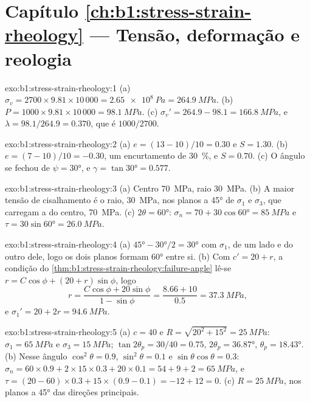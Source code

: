 \section*{Capítulo \ref{ch:b1:stress-strain-rheology} --- Tensão, deformação e reologia}

\begin{solution}{exo:b1:stress-strain-rheology:1}
(a) $\sigma_v = 2700\times9.81\times10\,000 = \qty{2.65e8}{Pa} = \qty{264.9}{MPa}$.
(b) $P = 1000\times9.81\times10\,000 = \qty{98.1}{MPa}$. (c) $\sigma_v' =
264.9 - 98.1 = \qty{166.8}{MPa}$, e $\lambda = 98.1/264.9 = 0.370$, que é
$1000/2700$.
\end{solution}

\begin{solution}{exo:b1:stress-strain-rheology:2}
(a) $e = (13-10)/10 = 0.30$ e $S = 1.30$. (b) $e = (7-10)/10 = -0.30$, um
encurtamento de \qty{30}{\percent}, e $S = 0.70$. (c) O ângulo se fechou de
$\psi = \ang{30}$, e $\gamma = \tan\ang{30} = 0.577$.
\end{solution}

\begin{solution}{exo:b1:stress-strain-rheology:3}
(a) Centro \qty{70}{MPa}, raio \qty{30}{MPa}. (b) A maior tensão de cisalhamento
é o raio, \qty{30}{MPa}, nos planos a \ang{45} de $\sigma_1$ e
$\sigma_3$, que carregam a  do centro, \qty{70}{MPa}. (c)
$2\theta = \ang{60}$: $\sigma_n = 70 + 30\cos\ang{60} = \qty{85}{MPa}$ e
$\tau = 30\sin\ang{60} = \qty{26.0}{MPa}$.
\end{solution}

\begin{solution}{exo:b1:stress-strain-rheology:4}
(a) $\ang{45} - \ang{30}/2 = \ang{30}$ com $\sigma_1$, de um lado e do outro dele, logo os dois planos formam \ang{60} entre si. (b) Com $c' = 20 + r$, a
condição do \cref{thm:b1:stress-strain-rheology:failure-angle} lê-se
$r = C\cos\phi + (20 + r)\sin\phi$, logo
\[
  r = \frac{C\cos\phi + 20\sin\phi}{1 - \sin\phi} = \frac{8.66 + 10}{0.5}
    = \qty{37.3}{MPa},
\]
e $\sigma_1' = 20 + 2r = \qty{94.6}{MPa}$.
\end{solution}

\begin{solution}{exo:b1:stress-strain-rheology:5}
(a) $c = 40$ e $R = \sqrt{20^2 + 15^2} = \qty{25}{MPa}$: $\sigma_1 =
\qty{65}{MPa}$ e $\sigma_3 = \qty{15}{MPa}$; $\tan2\theta_p = 30/40 = 0.75$,
$2\theta_p = \ang{36.87}$, $\theta_p = \ang{18.43}$. (b) Nesse ângulo
$\cos^2\theta = 0.9$, $\sin^2\theta = 0.1$ e $\sin\theta\cos\theta = 0.3$:
$\sigma_n = 60\times0.9 + 2\times15\times0.3 + 20\times0.1 = 54 + 9 + 2 =
\qty{65}{MPa}$, e $\tau = (20-60)\times0.3 + 15\times(0.9-0.1) = -12 + 12 =
0$. (c) $R = \qty{25}{MPa}$, nos planos a \ang{45} das direções principais.
\end{solution}

